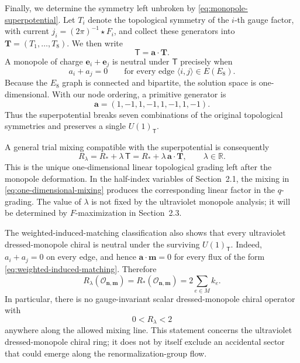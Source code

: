 \documentclass[11pt,a4paper]{article}
\numberwithin{equation}{section}
\begin{document}
Finally, we determine the symmetry left unbroken by \eqref{eq:monopole-superpotential}.  Let $T_i$ denote the topological symmetry of the $i$-th gauge factor, with current $j_i=(2\pi)^{-1}\star F_i$, and collect these generators into $\boldsymbol T=(T_1,\ldots,T_8)$.  We then write
\begin{equation}
  \mathsf T=\boldsymbol a\cdot\boldsymbol T.
\end{equation}
A monopole of charge $\boldsymbol e_i+\boldsymbol e_j$ is neutral under $\mathsf T$ precisely when
\begin{equation}
  a_i+a_j=0
  \qquad
  \text{for every edge }\langle i,j\rangle\in E(E_8).
  \label{eq:bipartite-condition}
\end{equation}
Because the $E_8$ graph is connected and bipartite, the solution space is one-dimensional.  With our node ordering, a primitive generator is
\begin{equation}
  \boldsymbol a=(1,-1,1,-1,1,-1,1,-1).
  \label{eq:residual-topological-vector}
\end{equation}
Thus the superpotential breaks seven combinations of the original topological symmetries and preserves a single $U(1)_{\mathsf T}$.

A general trial mixing compatible with the superpotential is consequently
\begin{equation}
  R_\lambda
  =R_*+\lambda\,\mathsf T
  =R_*+\lambda\,\boldsymbol a\cdot\boldsymbol T,
  \qquad \lambda\in\mathbb R.
  \label{eq:one-dimensional-mixing}
\end{equation}
This is the unique one-dimensional linear topological grading left after the monopole deformation.  In the half-index variables of Section~2.1, the mixing in \eqref{eq:one-dimensional-mixing} produces the corresponding linear factor in the $q$-grading.  The value of $\lambda$ is not fixed by the ultraviolet monopole analysis; it will be determined by $F$-maximization in Section~2.3.

The weighted-induced-matching classification also shows that every ultraviolet dressed-monopole chiral is neutral under the surviving $U(1)_{\mathsf T}$.  Indeed, $a_i+a_j=0$ on every edge, and hence $\boldsymbol a\cdot\boldsymbol m=0$ for every flux of the form \eqref{eq:weighted-induced-matching}.  Therefore
\begin{equation}
  R_\lambda(\mathcal O_{\boldsymbol n,\boldsymbol m})
  =R_*(\mathcal O_{\boldsymbol n,\boldsymbol m})
  =2\sum_{e\in M}k_e.
  \label{eq:monopole-R-on-mixing-line}
\end{equation}
In particular, there is no gauge-invariant scalar dressed-monopole chiral operator with
\begin{equation}
  0<R_\lambda<2
  \label{eq:no-low-R-monopole}
\end{equation}
anywhere along the allowed mixing line.  This statement concerns the ultraviolet dressed-monopole chiral ring; it does not by itself exclude an accidental sector that could emerge along the renormalization-group flow.
\end{document}
